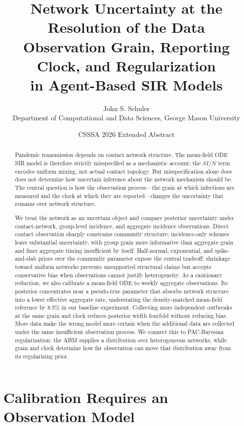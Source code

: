 \documentclass[11pt]{article}
\title{\textbf{Network Uncertainty at the Resolution of the Data}\\[0.4em]
\large Observation Grain, Reporting Clock, and Regularization\\
in Agent-Based SIR Models}
\author{John S. Schuler\\
\small Department of Computational and Data Sciences, George Mason University}
\date{CSSSA 2026 Extended Abstract}
\begin{document}
\maketitle

\begin{abstract}
\noindent
Pandemic transmission depends on contact network structure. The mean-field ODE SIR
model is therefore strictly misspecified as a mechanistic account: the $SI/N$ term
encodes uniform mixing, not actual contact topology. But misspecification alone does
does not determine how uncertain inference about the network mechanism should be.
The central question is how the observation process---the grain at which infections
are measured and the clock at which they are reported---changes the uncertainty
that remains over network structure.

We treat the network as an uncertain object and compare posterior uncertainty under
contact-network, group-level incidence, and aggregate incidence observations. Direct
contact observation sharply constrains community structure; incidence-only schemes
leave substantial uncertainty, with group grain more informative than aggregate
grain and finer aggregate timing insufficient by itself. Half-normal, exponential,
and spike-and-slab priors over the community parameter expose the central tradeoff:
shrinkage toward uniform networks prevents unsupported structural claims but accepts
conservative bias when observations cannot justify heterogeneity. As a cautionary reduction,
we also calibrate a mean-field ODE to weekly aggregate observations. Its posterior
concentrates near a pseudo-true
parameter that absorbs network structure into a lower effective aggregate rate,
understating the density-matched mean-field reference by 8.5\% in our baseline experiment.
Collecting more independent outbreaks at the same grain and clock reduces posterior
width fourfold without reducing bias. More data make the wrong model more certain
when the additional data are collected under the same insufficient observation process.
We connect this to PAC-Bayesian regularization: the ABM supplies a distribution over
heterogeneous networks, while grain and clock determine how far observation can move
that distribution away from its regularizing prior.
\end{abstract}

\section{Calibration Requires an Observation Model}
\end{document}
